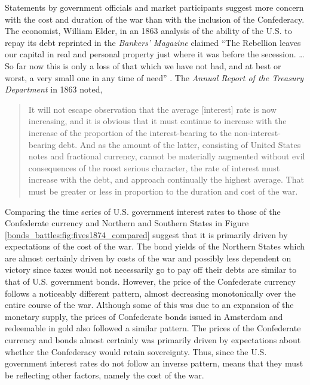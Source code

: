 Statements by government officials and market participants suggest more concern with the cost and duration of the war than with the inclusion of the Confederacy.
The economist, William Elder, in an 1863 analysis of the ability of the U.S. to repay its debt reprinted in the \textit{Bankers'  Magazine} claimed ``The Rebellion leaves our capital in real and personal property just where it was before the secession. \dots{} So far now this is only a loss of that which we have not had, and at best or worst, a very small one in any time of need'' \parencite[19]{Elder1863}.
The \textit{Annual Report of the Treasury Department} in 1863 noted,
\begin{quote}
It will not escape observation that the average [interest] rate is now increasing, and it is obvious that it must continue to increase with the increase of the proportion of the interest-bearing to the non-interest-bearing debt.
And as the amount of the latter, consisting of United States notes and fractional currency, cannot be materially augmented without evil consequences of the roost serious character, the rate of interest must increase with the debt, and approach continually the highest average.
That must be greater or less in proportion to the duration and cost of the war. \parencite[13]{Treasury1863}
\end{quote}

Comparing the time series of U.S. government interest rates to those of the Confederate currency and Northern and Southern States in Figure \ref{bonds_battles:fig:fives1874_compared} suggest that it is primarily driven by expectations of the cost of the war.
The bond yields of the Northern States which are almost certainly driven by costs of the war and possibly less dependent on victory since taxes would not necessarily go to pay off their debts are similar to that of U.S. government bonds.
However, the price of the Confederate currency follows a noticeably different pattern, almost decreasing monotonically over the entire course of the war.
Although some of this was due to an expansion of the monetary supply, the prices of Confederate bonds issued in Amsterdam and redeemable in gold also followed a similar pattern.
The prices of the Confederate currency and bonds almost certainly was primarily driven by expectations about whether the Confederacy would retain sovereignty.
Thus, since the U.S. government interest rates do not follow an inverse pattern, means that they must be reflecting other factors, namely the cost of the war.

